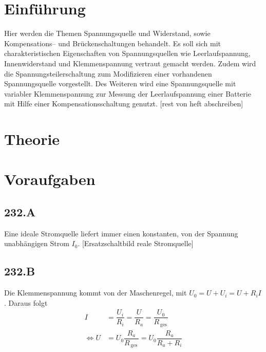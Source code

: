 \documentclass[a4paper,12pt]{article}
\numberwithin{equation}{section}
\begin{document}

\title{}
\author{}
\maketitle
{}


\newpage


\fancyhead[L]{\thepage}
\fancyfoot[C]{}

\tableofcontents


\newpage


\fancyhead[R]{\leftmark\\\rightmark}

\section{Einführung}
Hier werden die Themen \glqq Spannungsquelle\grqq{} und \glqq Widerstand\grqq{}, sowie Kompensations-- und Brückenschaltungen behandelt. Es soll sich mit charakteristischen Eigenschaften von Spannungsquellen wie Leerlaufspannung, Innenwiderstand und Klemmenspannung vertraut gemacht werden. Zudem wird die Spannungsteilerschaltung zum Modifizieren einer vorhandenen Spannungsquelle vorgestellt. Des Weiteren wird eine Spannungsquelle mit variabler Klemmenspannung zur Messung der Leerlaufspannung einer Batterie mit Hilfe einer Kompensationsschaltung genutzt. [rest von heft abschreiben]

\newpage
\section{Theorie}

\newpage
\section{Voraufgaben}
\subsection{232.A}
Eine ideale Stromquelle liefert immer einen konstanten, von der Spannung unabhängigen Strom $I_0$. [Ersatzschaltbild reale Stromquelle]

\subsection{232.B}
Die Klemmenspannung kommt von der Maschenregel, mit $U_0=U+U_i=U+R_iI$. Daraus folgt
\begin{align} 
        I&=\dfrac{U_i}{R_i}=\dfrac{U}{R_a}=\dfrac{U_0}{R_{\,\text{ges}\,}}\\
        \Leftrightarrow U&=U_0\dfrac{R_a}{R_{\,\text{ges}\,}}=U_0\dfrac{R_a}{R_a+R_i}
\end{align} 


\end{document}
